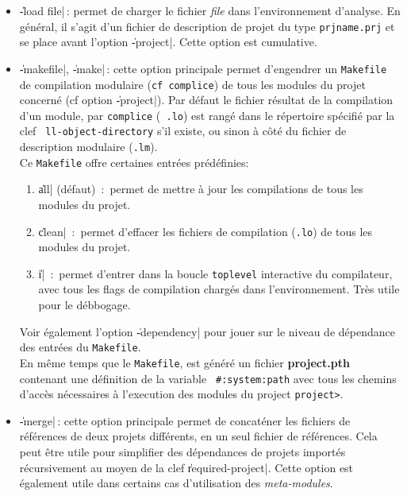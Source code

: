 \begin{itemize}
\item {\Large \|-load file|}\,: permet de charger le fichier {\em file}
dans l'environnement d'analyse. En g\'{e}n\'{e}ral, il s'agit d'un fichier
de description de projet du type {\tt prjname.prj} et se place avant
l'option \|-project|. 
Cette option est cumulative.

\item {\Large \|-makefile|, \|-make|}\,: cette option
principale permet 
d'engendrer un {\tt Makefile} de compilation modulaire ({\tt cf
complice}) de tous les modules du projet concern\'{e} (cf option
\|-project|). Par d\'{e}faut le fichier r\'{e}sultat de la compilation 
d'un module, par {\tt complice} ({\tt
.lo}) est rang\'{e} dans le r\'{e}pertoire sp\'{e}cifi\'{e} par la clef {\tt
ll-object-directory} s'il existe, ou sinon \`{a} c\^{o}t\'{e} du fichier de
description modulaire ({\tt .lm}). \\
Ce {\tt Makefile} offre certaines entr\'{e}es pr\'{e}d\'{e}finies:
\begin {enumerate}
\item \|all| (d\'{e}faut)\ :\ 
permet de mettre \`{a} jour les compilations de tous les modules du projet.
\item \|clean|\ :\ 
permet d'effacer les fichiers de compilation ({\tt .lo}) de tous les
modules du projet.
\item \|i|\ :\ 
permet d'entrer dans la boucle {\tt toplevel} interactive du
compilateur, avec tous les flags de compilation charg\'{e}s dans
l'environnement. Tr\`{e}s utile pour le d\'{e}bbogage.
\end{enumerate}
Voir \'{e}galement l'option \|-dependency| pour jouer sur le niveau de
d\'{e}pendance des entr\'{e}es du {\tt Makefile}.\\
En m\^{e}me temps que le {\tt Makefile}, est g\'{e}n\'{e}r\'{e} un fichier {\bf
project.pth} contenant une d\'{e}finition de la variable {\tt
\#:system:path} avec tous les chemins d'acc\`{e}s n\'{e}cessaires \`{a}
l'execution des modules du project {\tt project>}.

\item {\Large \|-merge|}\,: cette option principale permet de
concat\'{e}ner les fichiers de 
r\'{e}f\'{e}rences de deux projets diff\'{e}rents, en un seul fichier de
r\'{e}f\'{e}rences. Cela peut \^{e}tre utile pour simplifier des d\'{e}pendances
de projets import\'{e}s r\'{e}cursivement au moyen de la clef
\|required-project|. Cette option est \'{e}galement utile dans certains
cas d'utilisation des {\em meta-modules}.


\end{itemize}
